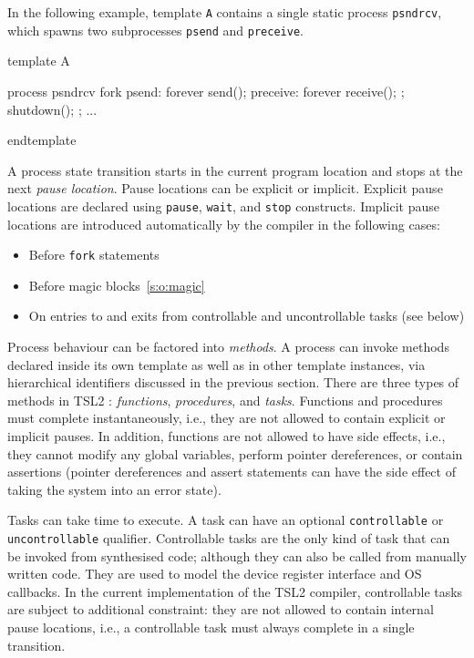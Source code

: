 \documentclass{report}
\newcommand{\src}[1]{\texttt{#1}}
\newcommand{\tsl}{TSL2 }
\begin{document}
In the following example, template \src{A} contains a single 
static process \src{psndrcv}, which spawns two subprocesses 
\src{psend} and \src{preceive}.
\begin{tsllisting}{}
template A

process psndrcv {
  fork {
    psend:    forever send();
    preceive: forever receive();
  };
  shutdown();
};
...

endtemplate
\end{tsllisting}


A process state transition starts in the current program location 
and stops at the next \emph{pause location}.  Pause locations can 
be explicit or implicit.  Explicit pause locations are declared 
using \src{pause}, \src{wait}, and \src{stop} constructs.  
Implicit pause locations are introduced automatically by the 
compiler in the following cases:

\begin{itemize}
    \item Before \src{fork} statements
    \item Before magic blocks~\ref{s:o:magic}
    \item On entries to and exits from controllable and 
        uncontrollable tasks (see below)
\end{itemize}

Process behaviour can be factored into \emph{methods}.  A process 
can invoke methods declared inside its own template as well as in 
other template instances, via hierarchical identifiers discussed 
in the previous section.  There are three types of methods in 
\tsl: \emph{functions}, \emph{procedures}, and \emph{tasks}.  
Functions and procedures must complete instantaneously, i.e., they 
are not allowed to contain explicit or implicit pauses.  In 
addition, functions are not allowed to have side effects, i.e., 
they cannot modify any global variables, perform pointer 
dereferences, or contain assertions (pointer dereferences and 
assert statements can have the side effect of taking the system 
into an error state).  

Tasks can take time to execute.  A task can have an optional 
\src{controllable} or \src{uncontrollable} qualifier.  
Controllable tasks are the only kind of task that can be invoked 
from synthesised code; although they can also be called from 
manually written code.  They are used to model the device register 
interface and OS callbacks.  In the current implementation of the 
\tsl compiler, controllable tasks are subject to additional 
constraint: they are not allowed to contain internal pause 
locations, i.e., a controllable task must always complete in a 
single transition. 
\end{document}
